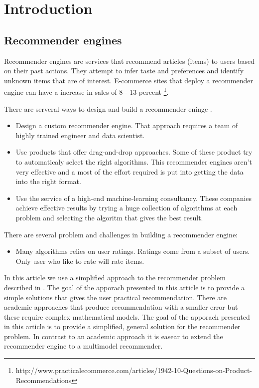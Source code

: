 \documentclass[twoside,a4paper]{article}
\begin{document}
\section{Introduction}
\label{sec:intro}

\subsection{Recommender engines}
\label{sec:recommenderengines}

Recommender engines are services that recommend articles (items) to users based on their past actions. They attempt to infer taste and preferences and identify unknown items that are of interest.
E-commerce sites that deploy a recommender engine can have a increase in sales of 8 - 13 percent \footnote{http://www.practicalecommerce.com/articles/1942-10-Questions-on-Product-Recommendations}.

There are serveral ways to design and build a recommender eninge \cite{Dunning14}.

\begin{itemize}
\item Design a custom recommender engine. That approach requires a team of highly trained engineer and data scientist.
\item Use products that offer drag-and-drop approaches. Some of these product try to automaticaly select the right algorithms. This recommender engines aren't very effective and a most of the effort required is put into getting the data into the right format.
\item Use the service of a high-end machine-learning consultancy. These companies achieve effective results by trying a huge collection of algorithms at each problem and selecting the algoritm that gives the best result.
\end{itemize}

There are several problem and challenges in building a recommender engine:
\begin{itemize}
\item Many algorithms relies on user ratings. Ratings come from a subset of users. Only user who like to rate will rate items. 
\end{itemize}

In this article we use a simplified approach to the recommender problem described in \cite{Dunning14}. The goal of the apporach presented in this article is to provide a simple solutions that gives the user practical recommendation. There are academic approaches that produce recommendation with a smaller error but these require complex mathematical models. The goal of the apporach presented in this article is to provide a simplified, general solution for the recommender problem. In contrast to an academic approach it is easear to extend the recommender engine to a multimodel recommender.
\end{document}
